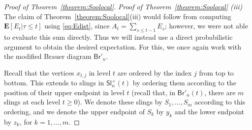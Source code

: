\documentclass[a4paper,11pt,reqno]{amsart}
\newcommand{\paul}[1]{\todo[color=yellow!70,inline]{Paul: #1}}
\newcommand{\fabian}[1]{\todo[color=red!50,inline]{Fabian: #1}}
\newcommand{\bE}{\mathbf{E}}
\newcommand{\Br}{\mathsf{Br}}
\newcommand{\Slr}{\mathsf{Sl}^+}
\theoremstyle{definition}
\begin{document}
\begin{proof}[Proof of Theorem~\ref{theorem:Soolocal}]
 
 \emph{Proof of Theorem~\ref{theorem:Soolocal} (iii)}
 The claim of Theorem~\ref{theorem:Soolocal}(iii) would follow from computing $\bE[E_t|\tau\leq t]$ using \eqref{eq:Edist}, since $A_t = \sum_{s \leq t-1} E_s$; however, we were not able to evaluate this sum directly. Thus we will instead use a direct probabilistic argument to obtain the desired expectation. For this, we once again work with the modified Brauer diagram $\Br'_n$.
 
 Recall that the vertices $x_{t,j}$ in level $t$ are ordered by the index $j$ from top to bottom.
 This extends to slings in $\Slr_n(t)$ by ordering them according to the position of their upper endpoint in level $t$ (recall that, in $\Br'_n(t)$, there are $m$ slings at each level $t\geq 0$). We denote these slings by $S_1,\dots,S_m$ according to this ordering, and we denote the upper endpoint of $S_k$ by $y_k$ and the lower endpoint by $z_k$, for $k=1,\dots,m$. 
 
 

\end{proof}
\end{document}
